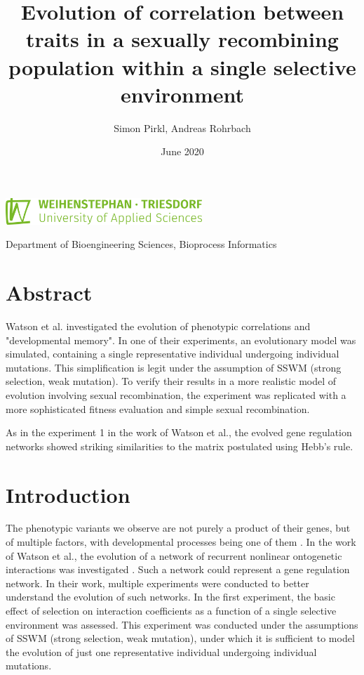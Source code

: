 \documentclass{article}
\title{Evolution of correlation between traits in a sexually recombining population within a single selective environment}
\date{June 2020}
\author{Simon Pirkl, Andreas Rohrbach}
\begin{document}
\maketitle

\begin{center}
	\includegraphics[height=10mm]{./img/ci/HSWT_Logo_gruen.png}

	\vspace{5mm}
	Department of Bioengineering Sciences, Bioprocess Informatics
\end{center}

\vspace{30mm}

\tableofcontents
\newpage

\section{Abstract}

Watson et al. investigated the evolution of phenotypic correlations and "developmental memory". In one of their experiments, an evolutionary model was simulated, containing a single representative individual undergoing individual mutations. This simplification is legit under the assumption of SSWM (strong selection, weak mutation). 
To verify their results in a more realistic model of evolution involving sexual recombination, the experiment was replicated with a more sophisticated fitness evaluation and simple sexual recombination.

As in the experiment 1 in the work of Watson et al., the evolved gene regulation networks showed striking similarities to the matrix postulated using Hebb's rule.

\section{Introduction}

The phenotypic variants we observe are not purely a product of their genes, but of multiple factors, with developmental processes being one of them \cite{laland2015}. In the work of Watson et al., the evolution of a network of recurrent nonlinear ontogenetic interactions was investigated \cite{watson2014}. Such a network could represent a gene regulation network. In their work, multiple experiments were conducted to better understand the evolution of such networks. In the first experiment, the basic effect of selection on interaction coefficients as a function of a single selective environment was assessed. This experiment was conducted under the assumptions of SSWM (strong selection, weak mutation), under which it is sufficient to model the evolution of just one representative individual undergoing individual mutations. 
\end{document}
